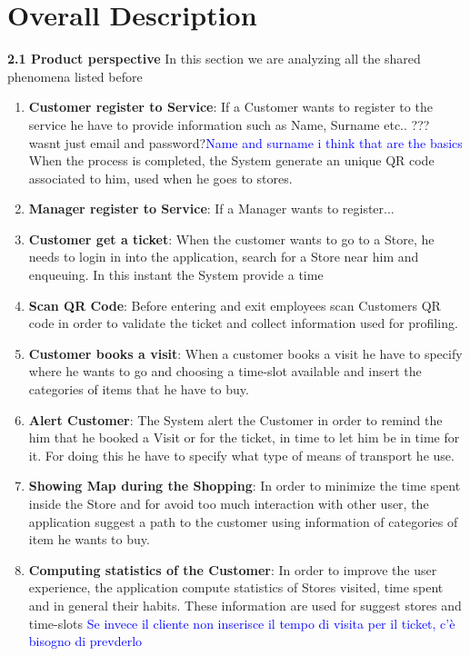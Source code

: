 \documentclass[a4paper, 10pt, oneside]{article}
\newcommand*{\lorenzo}[1]{\textcolor{BurntOrange}{#1}}
\newcommand{\giovanni}[1]{\textcolor{Blue}{#1}}
\begin{document}
\section{Overall Description}
\label{overallDescription}
{\large \textbf{2.1 Product perspective}}
\newline\newline
In this section we are analyzing all the shared phenomena listed before
\begin{enumerate}
\item \textbf{Customer register to Service}: If a Customer wants to register to the service he have to provide information such as Name, Surname etc.. \lorenzo{??? wasnt just email and password?}\giovanni{Name and surname i think that are the basics}
When the process is completed, the System generate an unique QR code associated to him, used when he goes to stores.

\item \textbf{Manager register to Service}: If a Manager wants to register...

\item \textbf{Customer get a ticket}: When the customer wants to go to a Store, he needs to login in into the application, search for a Store near him and enqueuing. In this instant the System provide a time 

\item \textbf{Scan QR Code}: Before entering and exit employees scan Customers QR code in order to validate the ticket and collect information used for profiling.

\item \textbf{Customer books a visit}: When a customer books a visit he have to specify where he wants to go and choosing a time-slot available and insert the categories of items that he have to buy. 

\item \textbf{Alert Customer}: The System alert the Customer in order to remind the him that he booked a Visit or for the ticket, in time to let him be in time for it.
For doing this he have to specify what type of means of transport he use.

\item \textbf{Showing Map during the Shopping}: In order to minimize the time spent inside the Store
and for avoid too much interaction with other user, the application suggest a path to the customer using information of categories of item he wants to buy.

\item \textbf{Computing statistics of the Customer}: In order to improve the user experience, the application compute statistics of Stores visited, time spent and in general their habits. These information are used for suggest stores and time-slots \giovanni{Se invece il cliente non inserisce il tempo di visita per il ticket, c'è bisogno di prevderlo}
\end{enumerate}
\end{document}
